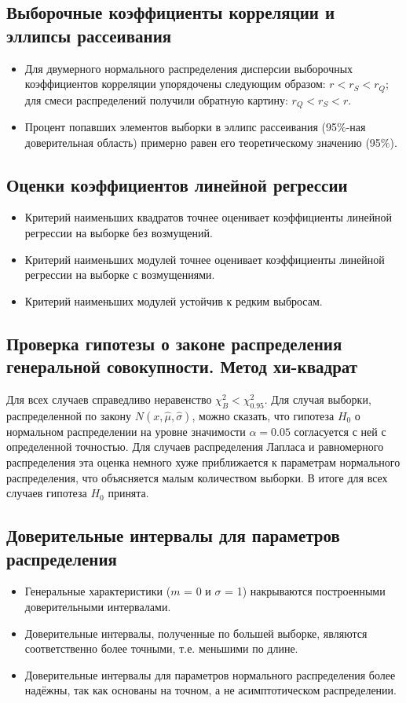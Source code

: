 \documentclass[../main.tex]{subfiles}
\begin{document}
    \subsection{Выборочные коэффициенты корреляции и эллипсы рассеивания}
    \begin{itemize}
        \item Для двумерного нормального распределения дисперсии выборочных коэффициентов корреляции упорядочены следующим образом: $r < r_{S} < r_{Q}$; для смеси распределений получили обратную картину: $r_{Q} < r_{S} < r$.
        \item Процент попавших элементов выборки в эллипс рассеивания (95$\%$-ная доверительная область) примерно равен его теоретическому значению (95$\%$).
    \end{itemize}
    \subsection{Оценки коэффициентов линейной регрессии}
    \begin{itemize}
        \item Критерий наименьших квадратов точнее оценивает коэффициенты линейной регрессии на выборке без возмущений.
        \item Критерий наименьших модулей точнее оценивает коэффициенты линейной регрессии на выборке с возмущениями.
        \item Критерий наименьших модулей устойчив к редким выбросам.
    \end{itemize}

    \subsection{Проверка гипотезы о законе распределения генеральной совокупности. Метод хи-квадрат}
        \noindent 
        Для всех случаев справедливо неравенство $\chi^2_B<\chi^2_{0.95}$. Для случая выборки, распределенной по закону $N(x,\hat{\mu},\hat{\sigma})$, можно сказать, что гипотеза $H_0$ о нормальном распределении на уровне значимости $\alpha=0.05$ согласуется с ней с определенной точностью. Для случаев распределения Лапласа и равномерного распределения эта оценка немного хуже приближается к параметрам нормального распределения, что объясняется малым количеством выборки. В итоге для всех случаев гипотеза $H_0$ принята.

    \subsection{Доверительные интервалы для параметров распределения}
    \begin{itemize}
        \item Генеральные характеристики ($m$ = 0 и $\sigma$ = 1) накрываются построенными доверительными интервалами. 
        \item Доверительные интервалы, полученные по большей выборке, являются соответственно более точными, т.е. меньшими по длине. 
        \item Доверительные интервалы для параметров нормального распределения более надёжны, так как основаны на точном, а не асимптотическом распределении.
\end{itemize}
\end{document}
